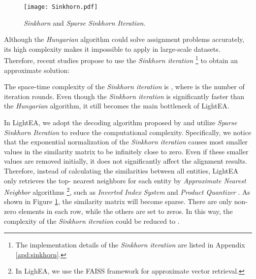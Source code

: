 \documentclass[11pt]{article}
\begin{document}
\begin{figure}
    \centering
    \texttt{[image: Sinkhorn.pdf]}
    \caption{\emph{Sinkhorn} and \emph{Sparse Sinkhorn Iteration}.}
    \label{fig:sink}
\end{figure}
Although the \emph{Hungarian} algorithm \cite{lawler1963quadratic} could solve assignment problems accurately, its high complexity  makes it impossible to apply in large-scale datasets.
Therefore, recent studies \cite{DBLP:conf/sigir/GeLCZG21, DBLP:conf/emnlp/MaoWWL21} propose to use the \emph{Sinkhorn iteration} \footnote{The implementation details of the \emph{Sinkhorn iteration} are listed in Appendix \ref{apd:sinkhorn}.} \cite{DBLP:conf/nips/Cuturi13} to obtain an approximate solution:

The space-time complexity of the \emph{Sinkhorn iteration} is , where  is the number of iteration rounds.
Even though the \emph{Sinkhorn iteration} is significantly faster than the \emph{Hungarian} algorithm, it still becomes the main bottleneck of LightEA.

In LightEA, we adopt the decoding algorithm proposed by \citet{Mao2022AnEA} and utilize \emph{Sparse Sinkhorn Iteration} to reduce the computational complexity.
Specifically, we notice that the exponential normalization of the \emph{Sinkhorn iteration} causes most smaller values in the similarity matrix  to be infinitely close to zero.
Even if these smaller values are removed initially, it does not significantly affect the alignment results.
Therefore, instead of calculating the similarities between all entities, LightEA only retrieves the top- nearest neighbors for each entity by \emph{Approximate Nearest Neighbor} algorithms \footnote{In LighEA, we use the FAISS framework \cite{johnson2019billion} for approximate vector retrieval.}, such as \emph{Inverted Index System} and \emph{Product Quantizer} \cite{DBLP:journals/pami/JegouDS11}.
As shown in Figure \ref{fig:sink}, the similarity matrix  will become sparse.
There are only  non-zero elements in each row, while the others are set to zeros.
In this way, the complexity of the \emph{Sinkhorn iteration} could be reduced to .
\end{document}
